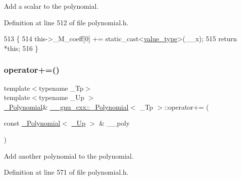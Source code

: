 Add a scalar to the polynomial. 

Definition at line 512 of file polynomial.\+h.


\begin{DoxyCode}
513         \{
514           this->\_M\_coeff[0] += \textcolor{keyword}{static\_cast<}\hyperlink{class____gnu__cxx_1_1__Polynomial_a725563351f50e76084a7a016c06f8a53}{value\_type}\textcolor{keyword}{>}(\_\_x);
515           \textcolor{keywordflow}{return} *\textcolor{keyword}{this};
516         \}
\end{DoxyCode}
\mbox{\label{class____gnu__cxx_1_1__Polynomial_ac7b0aafe9829a3eae65f79a99881fac2}} 
\subsubsection{\texorpdfstring{operator+=()}{operator+=()}\hspace{0.1cm}{\footnotesize\ttfamily [2/2]}}
{\footnotesize\ttfamily template$<$typename \+\_\+\+Tp$>$ \\
template$<$typename \+\_\+\+Up $>$ \\
\hyperlink{class____gnu__cxx_1_1__Polynomial}{\+\_\+\+Polynomial}\& \hyperlink{class____gnu__cxx_1_1__Polynomial}{\+\_\+\+\_\+gnu\+\_\+cxx\+::\+\_\+\+Polynomial}$<$ \+\_\+\+Tp $>$\+::operator+= (\begin{DoxyParamCaption}\item[{const \hyperlink{class____gnu__cxx_1_1__Polynomial}{\+\_\+\+Polynomial}$<$ \hyperlink{class____gnu__cxx_1_1__Polynomial_a242114d4b86648a5dff67a8221f80d40}{\+\_\+\+Up} $>$ \&}]{\+\_\+\+\_\+poly }\end{DoxyParamCaption})\hspace{0.3cm}{\ttfamily [inline]}}

Add another polynomial to the polynomial. 

Definition at line 571 of file polynomial.\+h.


